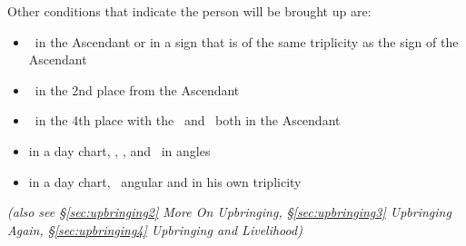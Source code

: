 Other conditions that indicate the person will be brought up are:

\begin{itemize}[topsep=0pt,itemsep=0pt]
\item \Jupiter\, in the Ascendant or in a sign that is of the same triplicity as the sign of the Ascendant 

\item \Jupiter\, in the 2nd place from the Ascendant

\item \Jupiter\, in the 4th place with the \Moon\, and \Mercury\, both in the Ascendant

\item in a day chart, \Saturn, \Jupiter, and \Mercury\, in angles

\item in a day chart, \Saturn\, angular and in his own triplicity
\end{itemize}

\textsl{\small(also see \S\ref{sec:upbringing2} More On Upbringing, \S\ref{sec:upbringing3} Upbringing Again, \S\ref{sec:upbringing4} Upbringing and Livelihood)}





